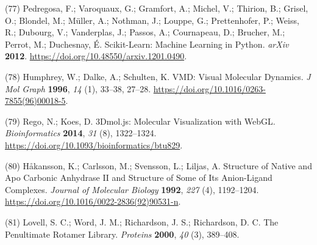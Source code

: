 \documentclass[  ASAPversion,
  ,
  9pt]{elife}
\newenvironment{cslreferences}%
  {}%
  {\par}
\begin{document}
\begin{cslreferences}
\leavevmode\hypertarget{ref-AujvwLp6}{}%
(77) Pedregosa, F.; Varoquaux, G.; Gramfort, A.; Michel, V.; Thirion, B.; Grisel, O.; Blondel, M.; Müller, A.; Nothman, J.; Louppe, G.; Prettenhofer, P.; Weiss, R.; Dubourg, V.; Vanderplas, J.; Passos, A.; Cournapeau, D.; Brucher, M.; Perrot, M.; Duchesnay, É. Scikit-Learn: Machine Learning in Python. \emph{arXiv} \textbf{2012}. \url{https://doi.org/10.48550/arxiv.1201.0490}.

\leavevmode\hypertarget{ref-PEXAwV3k}{}%
(78) Humphrey, W.; Dalke, A.; Schulten, K. VMD: Visual Molecular Dynamics. \emph{J Mol Graph} \textbf{1996}, \emph{14} (1), 33--38, 27--28. \url{https://doi.org/10.1016/0263-7855(96)00018-5}.

\leavevmode\hypertarget{ref-BguJBlg6}{}%
(79) Rego, N.; Koes, D. 3Dmol.js: Molecular Visualization with WebGL. \emph{Bioinformatics} \textbf{2014}, \emph{31} (8), 1322--1324. \url{https://doi.org/10.1093/bioinformatics/btu829}.

\leavevmode\hypertarget{ref-WjHESl20}{}%
(80) Håkansson, K.; Carlsson, M.; Svensson, L.; Liljas, A. Structure of Native and Apo Carbonic Anhydrase II and Structure of Some of Its Anion-Ligand Complexes. \emph{Journal of Molecular Biology} \textbf{1992}, \emph{227} (4), 1192--1204. \url{https://doi.org/10.1016/0022-2836(92)90531-n}.

\leavevmode\hypertarget{ref-Mg40Hdad}{}%
(81) Lovell, S. C.; Word, J. M.; Richardson, J. S.; Richardson, D. C. The Penultimate Rotamer Library. \emph{Proteins} \textbf{2000}, \emph{40} (3), 389--408.
\end{cslreferences}
\end{document}
